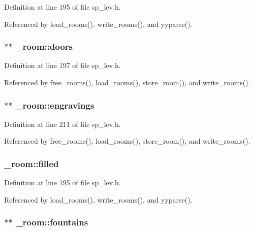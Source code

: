 Definition at line 195 of file sp\+\_\+lev.\+h.



Referenced by load\+\_\+rooms(), write\+\_\+rooms(), and yyparse().

\hypertarget{struct__room_a7680e15d05c73add8201e0b05ac24433}{
\subsubsection[{doors}]{$\ast$$\ast$ \+\_\+room\+::doors}}\label{struct__room_a7680e15d05c73add8201e0b05ac24433}


Definition at line 197 of file sp\+\_\+lev.\+h.



Referenced by free\+\_\+rooms(), load\+\_\+rooms(), store\+\_\+room(), and write\+\_\+rooms().

\hypertarget{struct__room_a39e5c581b788be17eaf8f3669fb7059a}{
\subsubsection[{engravings}]{$\ast$$\ast$ \+\_\+room\+::engravings}}\label{struct__room_a39e5c581b788be17eaf8f3669fb7059a}


Definition at line 211 of file sp\+\_\+lev.\+h.



Referenced by free\+\_\+rooms(), load\+\_\+rooms(), store\+\_\+room(), and write\+\_\+rooms().

\hypertarget{struct__room_a915f3f466b1a51ba9c70ea4cb669c19f}{
\subsubsection[{filled}]{ \+\_\+room\+::filled}}\label{struct__room_a915f3f466b1a51ba9c70ea4cb669c19f}


Definition at line 195 of file sp\+\_\+lev.\+h.



Referenced by load\+\_\+rooms(), write\+\_\+rooms(), and yyparse().

\hypertarget{struct__room_a4e68727ef155a3b332565ddf632b4e59}{
\subsubsection[{fountains}]{$\ast$$\ast$ \+\_\+room\+::fountains}}\label{struct__room_a4e68727ef155a3b332565ddf632b4e59}


